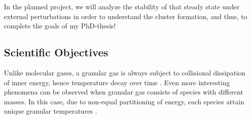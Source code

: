 \documentclass[11pt, notitlepage]{article} %
\begin{document}
In the planned project, we will analyze the stability of that steady state under external perturbations in order to understand the
cluster formation, and thus, to complete the goals of my PhD-thesis!\\

\subsection*{Scientific Objectives}
Unlike molecular gases, a granular gas is always subject to collisional dissipation of inner 
energy, hence temperature decay over time \citep{Haff1983, Brilliantov2004}. Even more interesting phenomena can be
observed when granular gas consists of species with different masses. In this case, 
due to non-equal partitioning of energy, each species attain unique granular
temperatures \citep{Garzo2007c, Osinsky2020}. 
\end{document}
